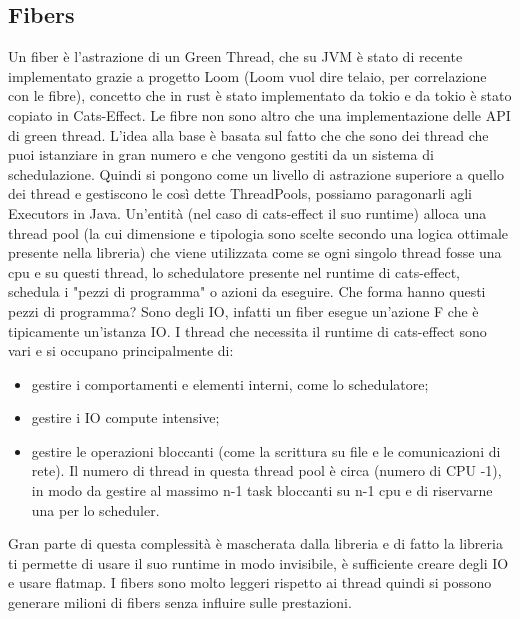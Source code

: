 \subsection{Fibers}
Un fiber è l'astrazione di un Green Thread, che su JVM è stato di recente implementato grazie a progetto Loom (Loom vuol dire telaio, per correlazione con le fibre), concetto che in rust è stato implementato da tokio e da tokio è stato copiato in Cats-Effect. Le fibre non sono altro che una implementazione delle API di green thread. L'idea alla base è basata sul fatto che che sono dei thread che puoi istanziare in gran numero e che vengono gestiti da un sistema di schedulazione. Quindi si pongono come un livello di astrazione superiore a quello dei thread e gestiscono le così dette ThreadPools, possiamo paragonarli agli Executors in Java. Un'entità (nel caso di cats-effect il suo runtime) alloca una thread pool (la cui dimensione e tipologia sono scelte secondo una logica ottimale presente nella libreria) che viene utilizzata come se ogni singolo thread fosse una cpu e su questi thread, lo schedulatore presente nel runtime di cats-effect, schedula i "pezzi di programma" o azioni da eseguire. Che forma hanno questi pezzi di programma? Sono degli IO, infatti un fiber esegue un’azione F che è tipicamente un’istanza IO.
I thread che necessita il runtime di cats-effect sono vari e si occupano principalmente di:
\begin{itemize}
    \item gestire i comportamenti e elementi interni, come lo schedulatore;
    \item gestire i IO compute intensive;
    \item gestire le operazioni bloccanti (come la scrittura su file e le comunicazioni di rete). Il numero di thread in questa thread pool è circa (numero di CPU -1), in modo da gestire al massimo n-1 task bloccanti su n-1 cpu e di riservarne una per lo scheduler.
\end{itemize}
Gran parte di questa complessità è mascherata dalla libreria e di fatto la libreria ti permette di usare il suo runtime in modo invisibile, è sufficiente creare degli IO e usare flatmap. I fibers sono molto leggeri rispetto ai thread quindi si possono generare milioni di fibers senza influire sulle prestazioni.

